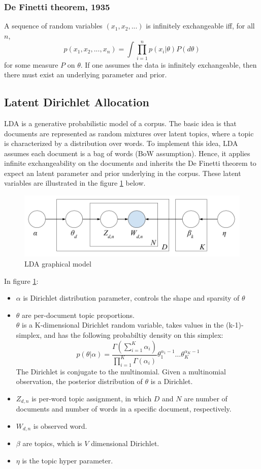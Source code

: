\documentclass[11pt]{article}
\begin{document}
\subsubsection{De Finetti theorem, 1935}
A sequence of random variables $(x_1,x_2,...)$ is infinitely exchangeable iff, for all $n$,
\[p(x_1,x_2,...,x_n)=\int\prod_{i=1}^{n}p(x_i|\theta)P(d\theta)\]
for some measure $P$ on $\theta$.
If one assumes the data is infinitely exchangeable, then there must exist an underlying parameter and prior.

\subsection{Latent Dirichlet Allocation} \label{lda}

LDA is a generative probabilistic model of a corpus. The basic idea is that documents are represented as random mixtures over latent topics, where a topic is characterized by a distribution over words. To implement this idea, LDA assumes each document is a bag of words (BoW assumption). Hence, it applies infinite exchangeability on the documents and inherits the De Finetti theorem to expect an latent parameter and prior underlying in the corpus. These latent variables are illustrated in the figure \ref{fig:lda_model} below.


\begin{figure}[ht]
	\centering
	\includegraphics[scale=0.3]{lda_model}
	\caption{LDA graphical model}
	\label{fig:lda_model}
\end{figure}

In figure \ref{fig:lda_model}:
\begin{itemize}
	\item $\alpha$ is Dirichlet distribution parameter, controls the shape and sparsity of $\theta$
	\item $\theta$ are per-document topic proportions.\\
	$\theta$ is a K-dimensional Dirichlet random variable, takes values in the (k-1)-simplex, and has the following probabiltiy density on this simplex:
	\[p(\theta|\alpha)=\frac{\Gamma(\sum_{i=1}^{K}\alpha_i)}{\prod_{i=1}^{K}\Gamma(\alpha_i)}\theta_1^{\alpha_1-1}\dots\theta_K^{\alpha_K-1}\]
	The Dirichlet is conjugate to the multinomial. Given a multinomial observation, the posterior distribution of $\theta$ is a Dirichlet.
	\item $Z_{d,n}$ is per-word topic assignment, in which $D$ and $N$ are number of documents and number of words in a specific document, respectively.
	\item $W_{d,n}$ is observed word.
	\item $\beta$ are topics, which is $V$ dimensional Dirichlet.
	\item $\eta$ is the topic hyper parameter.
\end{itemize}
\end{document}
